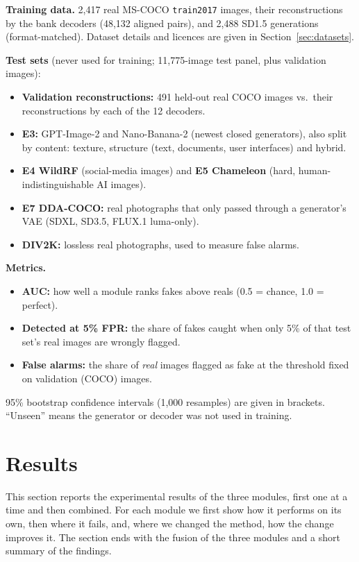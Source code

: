 \textbf{Training data.} 2,417 real MS-COCO \texttt{train2017} images, their reconstructions by the bank decoders (48,132 aligned pairs), and 2,488 SD1.5 generations (format-matched). Dataset details and licences are given in Section~\ref{sec:datasets}.

\textbf{Test sets} (never used for training; 11,775-image test panel, plus validation images):
\begin{itemize}
    \item \textbf{Validation reconstructions:} 491 held-out real COCO images vs.\ their reconstructions by each of the 12 decoders.
    \item \textbf{E3:} GPT-Image-2 and Nano-Banana-2 (newest closed generators), also split by content: texture, structure (text, documents, user interfaces) and hybrid.
    \item \textbf{E4 WildRF} (social-media images) and \textbf{E5 Chameleon} (hard, human-indistinguishable AI images).
    \item \textbf{E7 DDA-COCO:} real photographs that only passed through a generator's VAE (SDXL, SD3.5, FLUX.1 luma-only).
    \item \textbf{DIV2K:} lossless real photographs, used to measure false alarms.
\end{itemize}

\textbf{Metrics.}
\begin{itemize}
    \item \textbf{AUC:} how well a module ranks fakes above reals (0.5 = chance, 1.0 = perfect).
    \item \textbf{Detected at 5\% FPR:} the share of fakes caught when only 5\% of that test set's real images are wrongly flagged.
    \item \textbf{False alarms:} the share of \textit{real} images flagged as fake at the threshold fixed on validation (COCO) images.
\end{itemize}
95\% bootstrap confidence intervals (1,000 resamples) are given in brackets. ``Unseen'' means the generator or decoder was not used in training.


\newpage
\section{Results}
\label{sec:results}

This section reports the experimental results of the three modules, first one at a time and then combined. For each module we first show how it performs on its own, then where it fails, and, where we changed the method, how the change improves it. The section ends with the fusion of the three modules and a short summary of the findings.


